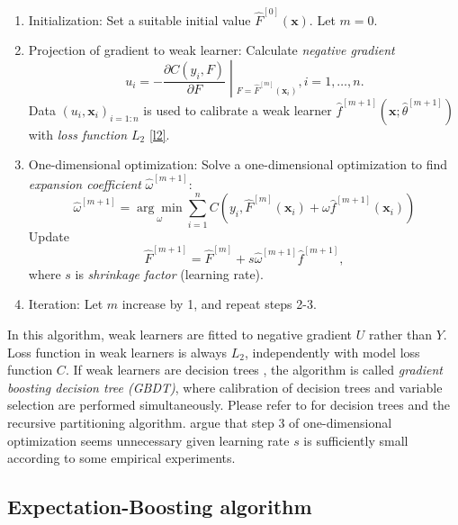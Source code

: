 \documentclass[11pt]{article}
\numberwithin{equation}{section}
\def\bx{\boldsymbol{x}}
\begin{document}
	\begin{enumerate}
		\item Initialization: Set a suitable initial value $\hat{F}^{[0]}(\bx).$ 
		Let $m=0.$
		\item Projection of gradient to weak learner:
		Calculate \textit{negative gradient} $$u_i=\left.-\frac{\partial C(y_i,F)}{\partial F}\middle|_{F=\hat{F}^{[m]}(\bx_i)}\right., i=1,\ldots,n.$$
		Data $(u_i,\bx_i)_{i=1:n}$ is used to calibrate a weak learner $\hat{f}^{[m+1]}(\bx;\hat{\theta}^{[m+1]})$ with \textit{loss function $L_2$} \eqref{l2}.
	
		\item One-dimensional optimization:
		Solve a one-dimensional optimization  to find \textit{expansion coefficient} $\hat{\omega}^{[m+1]}$:
		$$\hat{\omega}^{[m+1]}=\underset{\omega}{\arg\min}\sum_{i=1}^n C(y_i, \hat{F}^{[m]}(\bx_i)+\omega\hat{f}^{[m+1]}(\bx_i))$$
		Update $$\hat{F}^{[m+1]}=\hat{F}^{[m]}+s\hat{\omega}^{[m+1]}\hat{f}^{[m+1]},$$
		where $s$ is \textit{shrinkage factor} (learning rate).
		\item Iteration: Let $m$ increase by 1, and repeat steps 2-3.
			\end{enumerate}
In this algorithm, weak learners are fitted to negative gradient $U$ rather than $Y$.
		 Loss function in weak learners is always $L_2$, independently with model loss function $C$. 
		 If weak learners are decision trees \citep{breiman1983classification}, the algorithm is called \textit{gradient boosting decision tree (GBDT)}, where {calibration of decision trees and variable selection} are performed simultaneously.
		 Please refer to \citet{hastie2009elements} for decision trees and the recursive partitioning algorithm.
		\citet{buhlmann2007boosting} argue that step 3 of one-dimensional optimization seems unnecessary given learning rate $s$ is sufficiently small according to some empirical experiments.




\subsection{Expectation-Boosting algorithm}
\end{document}
